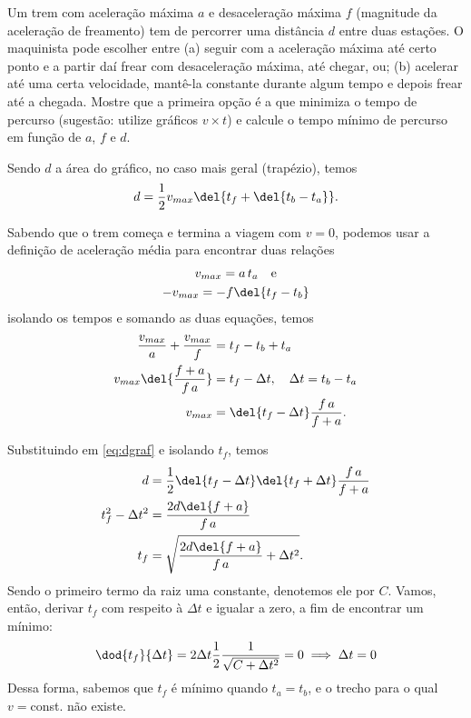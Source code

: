 \documentclass[]{IMTexam}
\begin{document}
\begin{questions}
	\question
	Um trem com aceleração máxima $ a $ e desaceleração máxima $ f $ (magnitude da aceleração de freamento) tem de percorrer uma distância $ d $ entre duas estações. O maquinista pode escolher entre (a) seguir com a aceleração máxima até certo ponto e a partir daí frear com desaceleração máxima, até chegar, ou; (b) acelerar até uma certa velocidade, mantê-la constante durante algum tempo e depois frear até a chegada. Mostre que a primeira opção é a que minimiza o tempo de percurso (sugestão: utilize gráficos $ v\times t  $) e calcule o tempo mínimo de percurso em função de $ a $, $ f $ e $ d $.

	\begin{solution}
		Sendo $ d $ a área do gráfico, no caso mais geral (trapézio), temos
		\begin{equation}\label{eq:dgraf}
			d=\dfrac{1}{2}v_{max}\del{t_f+\del{t_b-t_a}}.
		\end{equation}

		Sabendo que o trem começa e termina a viagem com $ v=0 $, podemos usar a definição de aceleração média para encontrar duas relações
		\begin{gather}
			v_{max}=a\,t_a\quad\text{e}\\
			-v_{max}=-f\del{t_f-t_b}
		\end{gather}
		isolando os tempos e somando as duas equações, temos
		\begin{align}
			\dfrac{v_{max}}{a}+\dfrac{v_{max}}{f} & =t_f-t_b+t_a\nonumber                                     \\
			v_{max}\del{\dfrac{f+a}{f\,a}}        & =t_f-\Delta t,\quad \Delta t=t_b-t_a\nonumber             \\
			v_{max}                               & =\del{t_f-\Delta t}\dfrac{f\,a}{f+a}.\label{eq:vmaxtrain}
		\end{align}

		Substituindo em \ref{eq:dgraf} e isolando $ t_f $, temos
		\begin{align*}
			d                    & =\dfrac{1}{2}\del{t_f-\Delta t}\del{t_f+\Delta t}\dfrac{f\,a}{f+a} \\
			t_f^{2}-\Delta t^{2} & =\dfrac{2d\del{f+a}}{f\,a}                                         \\
			t_f                  & =\sqrt{\dfrac{2d\del{f+a}}{f\,a}+\Delta t^{2}}.
		\end{align*}
		Sendo o primeiro termo da raiz uma constante, denotemos ele por $ C $. Vamos, então, derivar $ t_f $ com respeito à $ \Delta t $ e igualar a zero, a fim de encontrar um mínimo:
		\[ \dod{t_f}{\Delta t}=2\Delta t\dfrac{1}{2}\dfrac{1}{\sqrt{C+\Delta t^{2}}}=0\implies \Delta t=0 \]
		Dessa forma, sabemos que $ t_f $ é mínimo quando $ t_a=t_b $, e o trecho para o qual $ v= $const. não existe.


\end{solution}
\end{questions}
\end{document}
